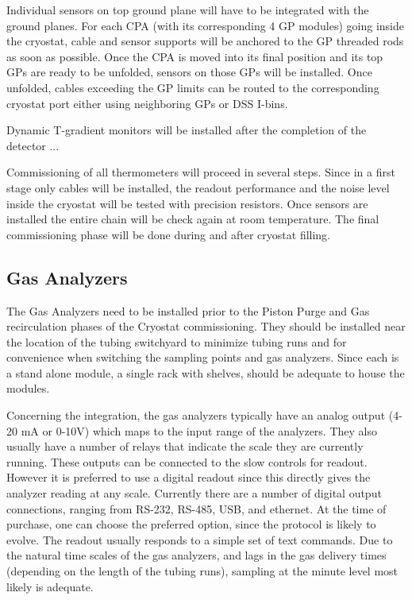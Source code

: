 Individual sensors on top ground plane will have to be integrated with the ground planes. For each CPA (with its corresponding 4 GP modules)
going inside the cryostat, cable and sensor supports will be anchored to the GP threaded rods as soon as possible.
Once the CPA is moved into its final position and its top GPs are ready to be unfolded, sensors on those GPs will be installed. Once unfolded, cables 
exceeding the GP limits can be routed to the corresponding cryostat port either using neighboring GPs or DSS I-bins. 


Dynamic T-gradient monitors will be installed after the completion of the detector ...



Commissioning of all thermometers will proceed in several steps. Since in a first stage only cables will be installed,
the readout performance and the noise level inside the cryostat will be
tested with precision resistors. Once sensors are installed the entire chain will be check again at room temperature.
The final commissioning phase will be done during and after cryostat filling.  


\subsection{Gas Analyzers}
\label{sec:fdgen-slow-cryo-install-ga}
 
The Gas Analyzers need to be installed prior to the Piston Purge and Gas recirculation phases of the Cryostat commissioning. They should be installed near the location of the tubing switchyard to minimize tubing runs and for convenience when switching the sampling points and gas analyzers. Since each is a stand alone module, a single rack with shelves, should be adequate to house the modules.

Concerning the integration, the gas analyzers typically have an analog output (4-20 \si{mA} or 0-10\si{V}) which maps to the input range of the analyzers. They also usually have a number of relays that indicate the scale they are currently running. These outputs can be connected to the slow controls for readout. However it is preferred to use a digital readout since this directly gives the analyzer reading at any scale. Currently there are a number of digital output connections, ranging from RS-232, RS-485, USB, and ethernet. At the time of purchase, one can choose the preferred option, since the protocol is likely to evolve. The readout usually responds to a simple set of text commands. Due to the natural time scales of the gas analyzers, and lags in the gas delivery times (depending on the length of the tubing runs), sampling at the minute level most likely is adequate.


